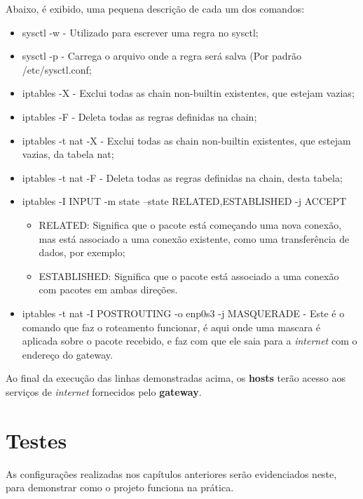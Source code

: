 \documentclass[
	12pt,				%
	openany,			%
	a4paper,			%
	chapter=TITLE,		%
	section=TITLE,		%
	english,
	brazil				%
]{abntex2}
\begin{document}
Abaixo, é exibido, uma pequena descrição de cada um dos comandos:
\begin{itemize}
	\item sysctl -w - Utilizado para escrever uma regra no sysctl;
	\item sysctl -p - Carrega o arquivo onde a regra será salva (Por padrão /etc/sysctl.conf;
	\item iptables -X - Exclui todas as chain non-builtin existentes, que estejam vazias;
	\item iptables -F - Deleta todas as regras definidas na chain;
	\item iptables -t nat -X - Exclui todas as chain non-builtin existentes, que estejam vazias, da tabela nat;
	\item iptables -t nat -F - Deleta todas as regras definidas na chain, desta tabela;
	\item iptables -I INPUT -m state --state RELATED,ESTABLISHED -j ACCEPT
		\begin{itemize}
			\item RELATED: Significa que o pacote está começando uma nova conexão, mas está associado a uma conexão existente, como uma transferência de dados, por exemplo;
			\item ESTABLISHED: Significa que o pacote está associado a uma conexão com pacotes em ambas direções.
		\end{itemize}
	\item iptables -t nat -I POSTROUTING -o enp0s3 -j MASQUERADE - Este é o comando que faz o roteamento funcionar, é aqui onde uma mascara é aplicada sobre o pacote recebido, e faz com que ele saia para a \textit{internet} com o endereço do gateway.
\end{itemize}


Ao final da execução das linhas demonstradas acima, os \textbf{hosts} terão acesso aos serviços de \textit{internet} fornecidos pelo \textbf{gateway}.
 
 

\section{Testes}

As configurações realizadas nos capítulos anteriores serão evidenciados neste, para demonstrar como o projeto funciona na prática.
\end{document}
